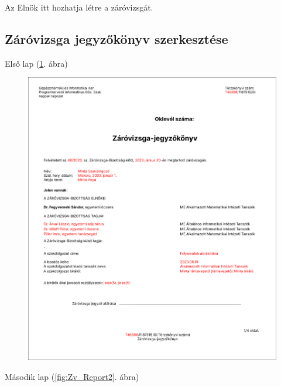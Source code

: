 \documentclass[a4paper,12pt]{article}
\begin{document}
Az Elnök itt hozhatja létre a záróvizsgát.

\subsection{Záróvizsga jegyzőkönyv szerkesztése}


Első lap (\ref{fig:Zv_Report1}. ábra)

\begin{figure}
	\centering
	\includegraphics[width=\textwidth]{images/Web_pages/Zv_Report1.png}
	\caption{}
	\label{fig:Zv_Report1}
\end{figure}

Második lap (\ref{fig:Zv_Report2}. ábra)
\end{document}
